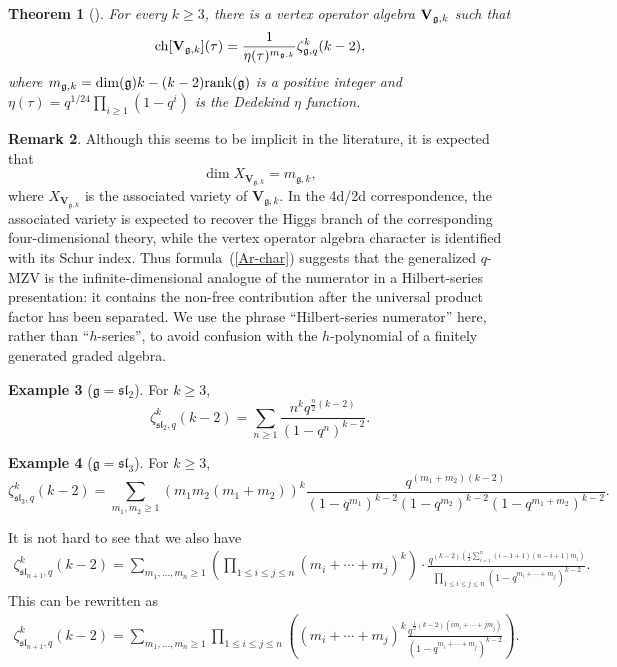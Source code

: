 \documentclass[10pt,a4paper]{amsart}
\numberwithin{equation}{section}
\newtheorem{Theorem}{Theorem}[section]
\theoremstyle{definition}
\newtheorem{Example}[Theorem]{Example}
\newtheorem{Remark}[Theorem]{Remark}
\begin{document}
\begin{Theorem}[\cite{Arakawa}] For every $k \geq 3$, there is a vertex operator algebra ${\bf V}_{\mathfrak{g},k}$ such that
\begin{equation} \label{Ar-char}
{\rm ch}[{\bf V}_{\mathfrak{g},k}](\tau)=\frac{1}{\eta(\tau)^{m_{\mathfrak{g},k}}} \zeta_{\mathfrak{g},q}^{k}(k-2),
\end{equation}
where $m_{\mathfrak{g},k}=\dim (\mathfrak{g})k-(k-2){\rm rank}(\mathfrak{g})$ is a positive integer and $\eta(\tau)=q^{1/24}\prod_{i \geq 1}(1-q^i)$ is the Dedekind $\eta$ function.
\end{Theorem}

\begin{Remark}
Although this seems to be implicit in the literature, it is expected that
\[
\dim X_{\mathbf V_{\mathfrak g,k}}=m_{\mathfrak g,k},
\]
where $X_{\mathbf V_{\mathfrak g,k}}$ is the associated variety of $\mathbf V_{\mathfrak g,k}$. In the 4d/2d correspondence, the associated variety is expected to recover the Higgs branch of the corresponding four-dimensional theory, while the vertex operator algebra character is identified with its Schur index. Thus formula~(\ref{Ar-char}) suggests that the generalized $q$-MZV is the infinite-dimensional analogue of the numerator in a Hilbert-series presentation: it contains the non-free contribution after the universal product factor has been separated. We use the phrase ``Hilbert-series numerator'' here, rather than ``$h$-series'', to avoid confusion with the $h$-polynomial of a finitely generated graded algebra.
\end{Remark}

\begin{Example}[$\mathfrak{g}=\mathfrak{sl}_2$] For $k \geq 3$,
\[
\zeta_{\mathfrak{sl}_2,q}^k(k-2)=\sum_{n \geq 1} \frac{n^k q^{\frac{n}{2} (k-2)} }{(1-q^n)^{k-2}}.
\]
\end{Example}

\begin{Example}[$\mathfrak{g}=\mathfrak{sl}_3$] For $k \geq 3$,
\[
\zeta_{\mathfrak{sl}_3,q}^k(k-2)=\sum_{m_1,m_2 \geq 1} \left( m_1 m_2 (m_1+m_2) \right)^k \frac{q^{(m_1 +m_2)(k-2)}}{(1-q^{m_1})^{k-2} (1-q^{m_2})^{k-2}(1-q^{m_1+m_2})^{k-2}}.
\]
\end{Example}

It is not hard to see that we also have
\begin{align*} %
 \zeta_{\mathfrak{sl}_{n+1},q}^k(k-2)
 =\sum_{m_1,\dots,m_n \geq 1} \left( \prod_{1 \leq i \leq j \leq n} (m_i+\cdots + m_j)^k\right) \cdot \frac{q^{(k-2)( \frac12 \sum_{i=1}^n (i-1+1)(n-i+1)m_i)}}{\prod_{1 \leq i \leq j \leq n} (1-q^{m_i+\cdots + m_j})^{k-2}}.
\end{align*}
This can be rewritten as
\begin{align*} %
 \zeta_{\mathfrak{sl}_{n+1},q}^k(k-2) =\sum_{m_1,\dots,m_n \geq 1} \prod_{1 \leq i \leq j \leq n} \left( (m_i+\cdots + m_j)^k \frac{q^{\frac12(k-2)( i m_i+\cdots + j m_j)}}{(1-q^{m_i+\cdots + m_j})^{k-2}}\right).
\end{align*}
\end{document}
